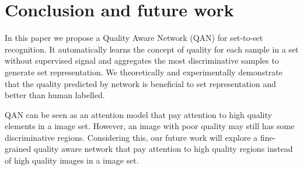 \section{Conclusion and future work}
\label{diss}
In this paper we propose a Quality Aware Network (QAN) for set-to-set recognition. It automatically learns the concept of quality for each sample in a set without supervised signal and aggregates the most discriminative samples to generate set representation. We theoretically and experimentally demonstrate that the quality predicted by network is beneficial to set representation and better than human labelled. 

QAN can be seen as an attention model that pay attention to high quality elements in a image set. However, an image with poor quality may still has some discriminative regions. Considering this, our future work will explore a fine-grained quality aware network that pay attention to high quality regions instead of high quality images in a image set.
